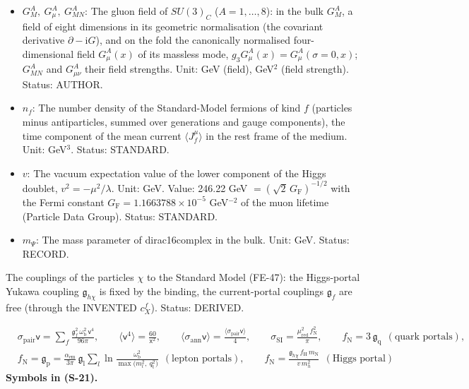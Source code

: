 \documentclass[
  10pt,
]{article}
\begin{document}
\begin{itemize}
  the QCD vacuum, a thermal value in the plasma). Unit: GeV\(^4\).
  Status: STANDARD.
\item
  \(G^A_M,\ G^A_\mu,\ G^A_{MN}\): The gluon field of \(SU(3)_C\)
  (\(A = 1, \dots, 8\)): in the bulk \(G^A_M\), a field of eight
  dimensions in its geometric normalisation (the covariant derivative
  \(\partial - \mathrm{i}G\)), and on the fold the canonically
  normalised four-dimensional field \(G^A_\mu(x)\) of its massless mode,
  \(g_3G^A_\mu(x) = G^A_\mu(\sigma = 0, x)\); \(G^A_{MN}\) and
  \(G^A_{\mu\nu}\) their field strengths. Unit: GeV (field), GeV\(^2\)
  (field strength). Status: AUTHOR.
\item
  \(n_f\): The number density of the Standard-Model fermions of kind
  \(f\) (particles minus antiparticles, summed over generations and
  gauge components), the time component of the mean current
  \(\langle J_f^\mu\rangle\) in the rest frame of the medium. Unit:
  GeV\(^3\). Status: STANDARD.
\item
  \(v\): The vacuum expectation value of the lower component of the
  Higgs doublet, \(v^2 = -\mu^2/\lambda\). Unit: GeV. Value: 246.22 GeV
  \(= (\sqrt2\,G_{\mathrm{F}})^{-1/2}\) with the Fermi constant
  \(G_{\mathrm{F}} = 1.1663788\times10^{-5}\) GeV\(^{-2}\) of the muon
  lifetime (Particle Data Group). Status: STANDARD.
\item
  \(m_\Psi\): The mass parameter of dirac16complex in the bulk. Unit:
  GeV. Status: RECORD.
\end{itemize}

The couplings of the particles \(\chi\) to the Standard Model (FE-47):
the Higgs-portal Yukawa coupling \(\mathfrak{g}_{h\chi}\) is fixed by
the binding, the current-portal couplings \(\mathfrak{g}_f\) are free
(through the INVENTED \(c^{f}_X\)). Status: DERIVED.

\[
\begin{aligned}
&\sigma_{\mathrm{pair}}\mathsf{v} = \sum_f\frac{\mathfrak{g}_f^2\,\omega_{\mathrm{b}}^2\,\mathsf{v}^4}{96\pi},\qquad \langle\mathsf{v}^4\rangle = \frac{60}{\mathsf{x}^2},\qquad
 \langle\sigma_{\mathrm{ann}}\mathsf{v}\rangle = \frac{\langle\sigma_{\mathrm{pair}}\mathsf{v}\rangle}{4},\qquad
 \sigma_{\mathrm{SI}} = \frac{\mu_{\mathrm{red}}^2\,f_{\mathrm{N}}^2}{\pi},\qquad f_{\mathrm{N}} = 3\,\mathfrak{g}_{\mathrm{q}}\ \ (\text{quark portals}),\\
&f_{\mathrm{N}} = \mathfrak{g}_{\mathrm{p}} = \frac{\alpha_{\mathrm{em}}}{3\pi}\,\mathfrak{g}_{\mathrm{l}}\sum_{l}\ln\frac{\omega_{\mathrm{b}}^2}{\max\big(m_l^2,\ q_{\mathrm{t}}^2\big)}\ \ (\text{lepton portals}),\qquad
 f_{\mathrm{N}} = \frac{\mathfrak{g}_{h\chi}\,f_{\mathrm{H}}\,m_{\mathrm{N}}}{v\,m_h^2}\ \ (\text{Higgs portal})
\end{aligned} \tag{S-21}
\] \textbf{Symbols in (S-21).}
\end{document}
